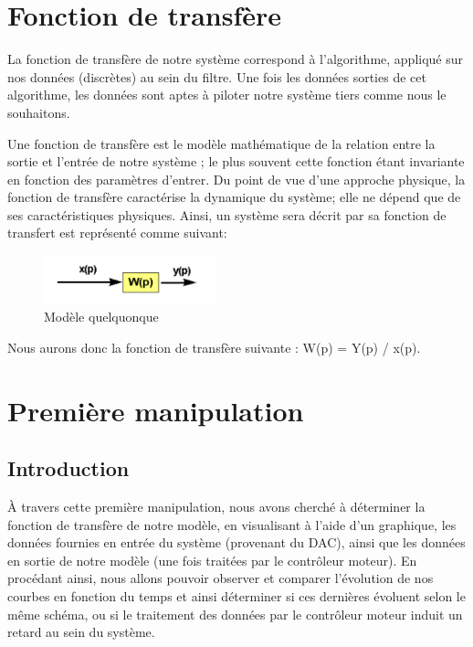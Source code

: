 \documentclass[french,a4paper,12pt]{report}
\begin{document}
		
	\section{Fonction de transfère}
	
		La fonction de transfère de notre système correspond à l'algorithme, appliqué sur nos données (discrètes) au sein du filtre. Une fois les données sorties de cet algorithme, les données sont aptes à piloter notre système tiers comme nous le souhaitons.
		
		Une fonction de transfère est le modèle mathématique de la relation entre la sortie et l'entrée de notre système ; le plus souvent cette fonction étant invariante en fonction des paramètres d'entrer.
		Du point de vue d'une approche physique, la fonction de transfère caractérise la dynamique du système; elle ne dépend que de ses caractéristiques physiques. 
		Ainsi, un système sera décrit par sa fonction de transfert est représenté comme suivant:

	\begin{figure}[!ht]
    \center
  	\includegraphics[width=5cm]{transf1.png}
    \caption{Modèle quelquonque}
	\end{figure}
	
	Nous aurons donc la fonction de transfère suivante : W(p) = Y(p) / x(p).
	
	\newpage
	
	\section{Première manipulation}
	
		\subsection{Introduction}
	
		À travers cette première manipulation, nous avons cherché à déterminer la fonction de transfère de notre modèle, en visualisant à l'aide d'un graphique, les données fournies en entrée du système (provenant du DAC), ainsi que les données en sortie de notre modèle (une fois traitées par le contrôleur moteur).
		En procédant ainsi, nous allons pouvoir observer et comparer l'évolution de nos courbes en fonction du temps et ainsi déterminer si ces dernières évoluent selon le même schéma, ou si le traitement des données par le contrôleur moteur induit un retard au sein du système.
		
\end{document}
